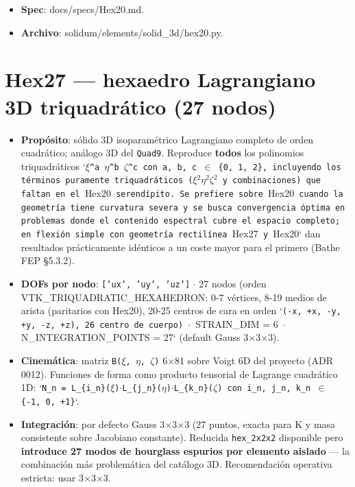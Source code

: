 \documentclass[11pt,letterpaper,oneside]{report}
\begin{document}
\begin{itemize}
  \item \textbf{Spec}: docs/specs/Hex20.md.
  \item \textbf{Archivo}: solidum/elements/solid\_3d/hex20.py.
\end{itemize}


\section{Hex27 --- hexaedro Lagrangiano 3D triquadrático (27 nodos)}

\begin{itemize}
  \item \textbf{Propósito}: sólido 3D isoparamétrico Lagrangiano completo de orden cuadrático; análogo 3D del \texttt{Quad9}. Reproduce \textbf{todos} los polinomios triquadráticos `\texttt{\ensuremath{\xi}\textasciicircum{}a \ensuremath{\eta}\textasciicircum{}b \ensuremath{\zeta}\textasciicircum{}c}\texttt{ con }\texttt{a, b, c \ensuremath{\in} \{0, 1, 2\}}\texttt{, incluyendo los términos puramente triquadráticos (}\texttt{\ensuremath{\xi}\ensuremath{^{2}}\ensuremath{\eta}\ensuremath{^{2}}\ensuremath{\zeta}\ensuremath{^{2}}}\texttt{ y combinaciones) que faltan en el }Hex20\texttt{ serendípito. Se prefiere sobre }Hex20\texttt{ cuando la geometría tiene curvatura severa y se busca convergencia óptima en problemas donde el contenido espectral cubre el espacio completo; en flexión simple con geometría rectilínea }Hex27\texttt{ y }Hex20` dan resultados prácticamente idénticos a un coste mayor para el primero (Bathe FEP §5.3.2).
  \item \textbf{DOFs por nodo}: \texttt{['ux', 'uy', 'uz']} \ensuremath{\cdot} 27 nodos (orden VTK\_TRIQUADRATIC\_HEXAHEDRON: 0-7 vértices, 8-19 medios de arista (paritarios con Hex20), 20-25 centros de cara en orden `\texttt{(-x, +x, -y, +y, -z, +z)}\texttt{, 26 centro de cuerpo) \ensuremath{\cdot} }STRAIN\_DIM = 6\texttt{ \ensuremath{\cdot} }N\_INTEGRATION\_POINTS = 27` (default Gauss 3\ensuremath{\times}3\ensuremath{\times}3).
  \item \textbf{Cinemática}: matriz \texttt{B(\ensuremath{\xi}, \ensuremath{\eta}, \ensuremath{\zeta})} 6\ensuremath{\times}81 sobre Voigt 6D del proyecto (ADR 0012). Funciones de forma como producto tensorial de Lagrange cuadrático 1D: `\texttt{N\_n = L\_\{i\_n\}(\ensuremath{\xi})\ensuremath{\cdot}L\_\{j\_n\}(\ensuremath{\eta})\ensuremath{\cdot}L\_\{k\_n\}(\ensuremath{\zeta})}\texttt{ con }\texttt{i\_n, j\_n, k\_n \ensuremath{\in} \{-1, 0, +1\}}`.
  \item \textbf{Integración}: por defecto Gauss 3\ensuremath{\times}3\ensuremath{\times}3 (27 puntos, exacta para K y masa consistente sobre Jacobiano constante). Reducida \texttt{hex\_2x2x2} disponible pero \textbf{introduce 27 modos de hourglass espurios por elemento aislado} --- la combinación más problemática del catálogo 3D. Recomendación operativa estricta: usar 3\ensuremath{\times}3\ensuremath{\times}3.

\end{itemize}
\end{document}
